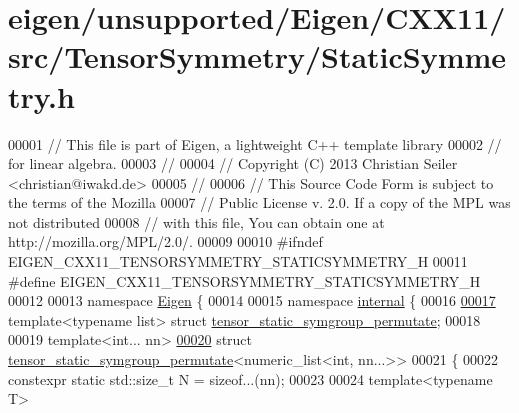 \hypertarget{eigen_2unsupported_2_eigen_2_c_x_x11_2src_2_tensor_symmetry_2_static_symmetry_8h_source}{}\section{eigen/unsupported/\+Eigen/\+C\+X\+X11/src/\+Tensor\+Symmetry/\+Static\+Symmetry.h}
\label{eigen_2unsupported_2_eigen_2_c_x_x11_2src_2_tensor_symmetry_2_static_symmetry_8h_source}

\begin{DoxyCode}
00001 \textcolor{comment}{// This file is part of Eigen, a lightweight C++ template library}
00002 \textcolor{comment}{// for linear algebra.}
00003 \textcolor{comment}{//}
00004 \textcolor{comment}{// Copyright (C) 2013 Christian Seiler <christian@iwakd.de>}
00005 \textcolor{comment}{//}
00006 \textcolor{comment}{// This Source Code Form is subject to the terms of the Mozilla}
00007 \textcolor{comment}{// Public License v. 2.0. If a copy of the MPL was not distributed}
00008 \textcolor{comment}{// with this file, You can obtain one at http://mozilla.org/MPL/2.0/.}
00009 
00010 \textcolor{preprocessor}{#ifndef EIGEN\_CXX11\_TENSORSYMMETRY\_STATICSYMMETRY\_H}
00011 \textcolor{preprocessor}{#define EIGEN\_CXX11\_TENSORSYMMETRY\_STATICSYMMETRY\_H}
00012 
00013 \textcolor{keyword}{namespace }\hyperlink{namespace_eigen}{Eigen} \{
00014 
00015 \textcolor{keyword}{namespace }\hyperlink{namespaceinternal}{internal} \{
00016 
\hyperlink{struct_eigen_1_1internal_1_1tensor__static__symgroup__permutate}{00017} \textcolor{keyword}{template}<\textcolor{keyword}{typename} list> \textcolor{keyword}{struct }\hyperlink{struct_eigen_1_1internal_1_1tensor__static__symgroup__permutate}{tensor\_static\_symgroup\_permutate};
00018 
00019 \textcolor{keyword}{template}<\textcolor{keywordtype}{int}... nn>
\hyperlink{struct_eigen_1_1internal_1_1tensor__static__symgroup__permutate_3_01numeric__list_3_01int_00_01nn_8_8_8_01_4_01_4}{00020} \textcolor{keyword}{struct }\hyperlink{struct_eigen_1_1internal_1_1tensor__static__symgroup__permutate}{tensor\_static\_symgroup\_permutate}<numeric\_list<int, nn...>>
00021 \{
00022   constexpr \textcolor{keyword}{static} std::size\_t N = \textcolor{keyword}{sizeof}...(nn);
00023 
00024   \textcolor{keyword}{template}<\textcolor{keyword}{typename} T>

\end{DoxyCode}
